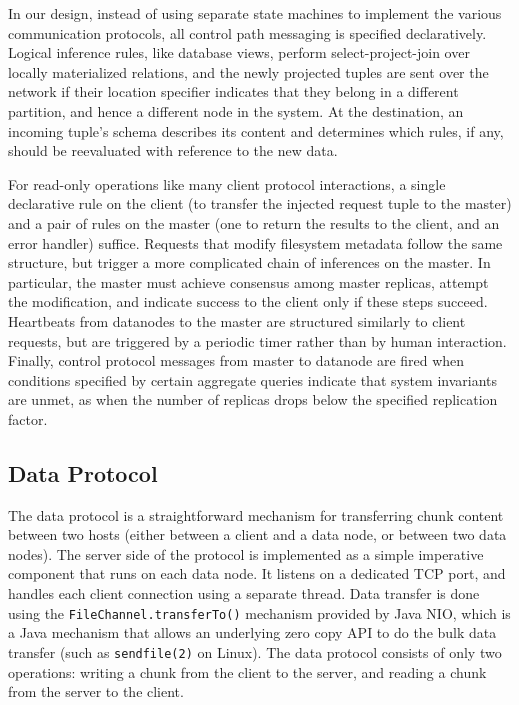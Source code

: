 \documentclass{article}
\begin{document}
In our design, instead of using separate state machines to implement the various communication protocols, all control path messaging is specified declaratively.  Logical inference rules, like database views, perform select-project-join over locally materialized relations, and the newly projected tuples are sent over the network if their location specifier indicates that they belong in a different partition, and hence a different node in the system.  At the destination, an incoming tuple's schema describes its content and determines which rules, if any, should be reevaluated with reference to the new data.

For read-only operations like many client protocol interactions, a single declarative rule on the client (to transfer the injected request tuple to the master) and a pair of rules on the master (one to return the results to the client, and an error handler) suffice.  Requests that modify filesystem metadata follow the same structure, but trigger a more complicated chain of inferences on the master.  In particular, the master must achieve consensus among master replicas, attempt the modification,  and indicate success to the client only if these steps succeed.  Heartbeats from datanodes to the master are structured similarly to client requests, but are triggered by a periodic timer rather than by human interaction.   Finally, control protocol messages from master to datanode are fired when conditions specified by certain aggregate queries indicate that system invariants are unmet, as when the number of replicas drops below the specified replication factor.  

\subsection{Data Protocol}
The data protocol is a straightforward mechanism for transferring
chunk content between two hosts (either between a client and a data
node, or between two data nodes). The server side of the protocol is
implemented as a simple imperative component that runs on each data
node. It listens on a dedicated TCP port, and handles each client
connection using a separate thread. Data transfer is done using the
\texttt{FileChannel.transferTo()} mechanism provided by Java NIO,
which is a Java mechanism that allows an underlying zero copy API to
do the bulk data transfer (such as \texttt{sendfile(2)} on Linux). The
data protocol consists of only two operations: writing a chunk from
the client to the server, and reading a chunk from the server to the
client.
\end{document}
